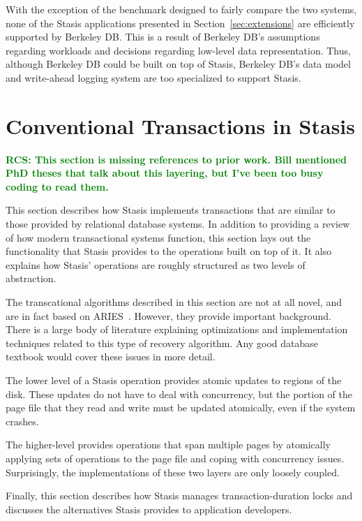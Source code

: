 \documentclass[letterpaper,twocolumn,10pt]{article}
\newcommand{\yad}{Stasis\xspace}
\newcommand{\yads}{Stasis'\xspace}
\newcommand{\rcs}[1]{\textcolor{green}{\bf RCS: #1}}
\begin{document}
With the exception of the benchmark designed to fairly compare the two
systems, none of the \yad applications presented in
Section~\ref{sec:extensions} are efficiently supported by Berkeley DB.
This is a result of Berkeley DB's assumptions regarding workloads and
decisions regarding low-level data representation.  Thus, although
Berkeley DB could be built on top of \yad, Berkeley DB's data model
and write-ahead logging system are too specialized to support \yad.




\section{Conventional Transactions in \yad}

\rcs{This section is missing references to prior work.  Bill mentioned
PhD theses that talk about this layering, but I've been too busy
coding to read them.}

This section describes how \yad implements transactions that are
similar to those provided by relational database systems.  In addition
to providing a review of how modern transactional systems function,
this section lays out the functionality that \yad provides to the
operations built on top of it.  It also explains how \yads
operations are roughly structured as two levels of abstraction.  

The transcational algorithms described in this section are not at all
novel, and are in fact based on ARIES~\cite{aries}.  However, they
provide important background.  There is a large body of literature
explaining optimizations and implementation techniques related to this
type of recovery algorithm.  Any good database textbook would cover these
issues in more detail.

The lower level of a \yad operation provides atomic
updates to regions of the disk.  These updates do not have to deal
with concurrency, but the portion of the page file that they read and
write must be updated atomically, even if the system crashes.

The higher-level provides operations that span multiple pages by
atomically applying sets of operations to the page file and coping
with concurrency issues.  Surprisingly, the implementations of these
two layers are only loosely coupled.

Finally, this section describes how \yad manages transaction-duration
locks and discusses the alternatives \yad provides to application developers.
\end{document}
